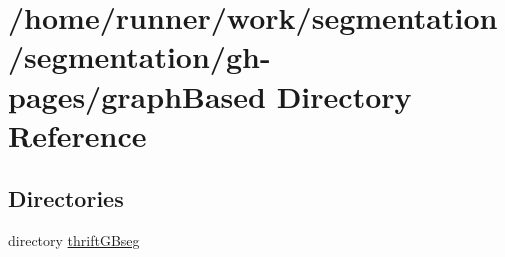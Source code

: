 \section{/home/runner/work/segmentation/segmentation/gh-\/pages/graph\+Based Directory Reference}
\label{dir_810a9d323a6c62904b9f192dc2ad08ed}
\subsection*{Directories}
\begin{DoxyCompactItemize}
\item 
directory \hyperlink{dir_f5c8695e01d8cc1f0e0e45ab08d0fc9c}{thrift\+G\+Bseg}
\end{DoxyCompactItemize}
